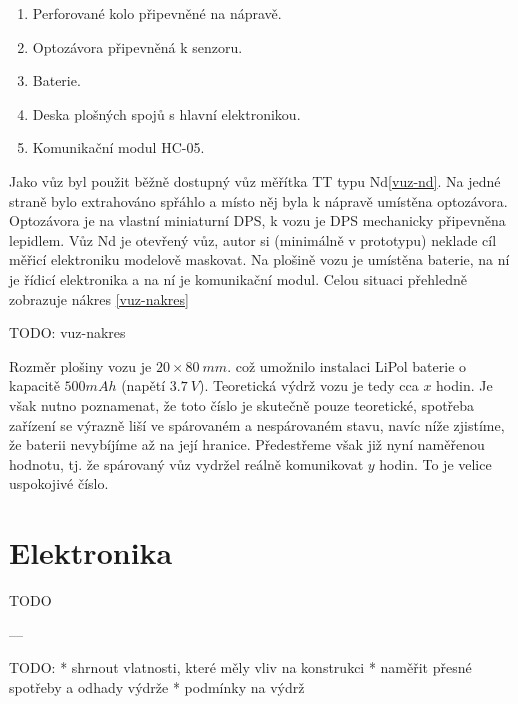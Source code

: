 \begin{enumerate}
\item Perforované kolo připevněné na nápravě.
\item Optozávora připevněná k senzoru.
\item Baterie.
\item Deska plošných spojů s hlavní elektronikou.
\item Komunikační modul HC-05.
\end{enumerate}

Jako vůz byl použit běžně dostupný vůz měřítka TT typu Nd\ref{vuz-nd}. Na
jedné straně bylo extrahováno spřáhlo a místo něj byla k nápravě umístěna
optozávora. Optozávora je na vlastní miniaturní DPS, k vozu je DPS mechanicky
připevněna lepidlem. Vůz Nd je otevřený vůz, autor si (minimálně v prototypu)
neklade cíl měřicí elektroniku modelově maskovat. Na plošině vozu je umístěna
baterie, na ní je řídicí elektronika a na ní je komunikační modul. Celou
situaci přehledně zobrazuje nákres \ref{vuz-nakres}

TODO: vuz-nakres

Rozměr plošiny vozu je $20\times80\ mm$. což umožnilo instalaci LiPol baterie
o kapacitě $500 mAh$ (napětí $3.7\ V$). Teoretická výdrž vozu je tedy cca $x$
hodin. Je však nutno poznamenat, že toto číslo je skutečně pouze teoretické,
spotřeba zařízení se výrazně liší ve spárovaném a nespárovaném stavu, navíc
níže zjistíme, že baterii nevybíjíme až na její hranice. Předestřeme však již
nyní naměřenou hodnotu, tj. že spárovaný vůz vydržel reálně komunikovat
$y$ hodin. To je velice uspokojivé číslo.

\section{Elektronika}

TODO

---

TODO:
 * shrnout vlatnosti, které měly vliv na konstrukci
 * naměřit přesné spotřeby a odhady výdrže
 * podmínky na výdrž
